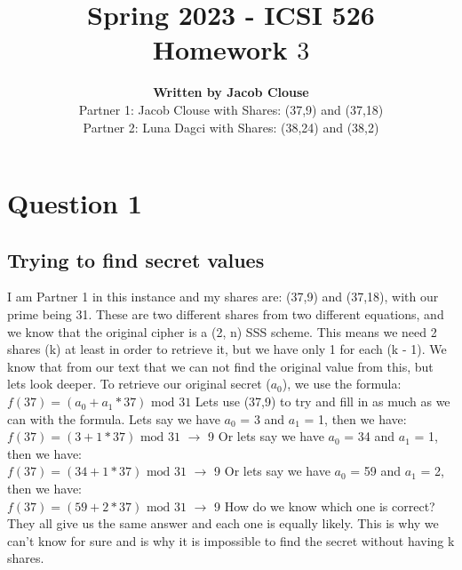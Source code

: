 \documentclass[10pt]{article}
\author{\vspace{0.2in}\textbf{Written by Jacob Clouse}\\  Partner 1: Jacob Clouse with Shares: (37,9) and (37,18)\\ Partner 2: Luna Dagci with Shares: (38,24) and (38,2)}
\title{Spring 2023 - ICSI 526\\Homework $3$}
\begin{document}
\maketitle
\tableofcontents
\vspace{0.2in}
\section{Question 1}
\subsection{Trying to find secret values}
\noindent I am Partner 1 in this instance and my shares are: (37,9) and  (37,18), with our prime being 31. These are two different shares from two different equations, and we know that the original cipher is a (2, n) SSS scheme. This means we need 2 shares (k) at least in order to retrieve it, but we have only 1 for each (k - 1). We know that from our text that we can not find the original value from this, but lets look deeper. To retrieve our original secret ($a_0$), we use the formula:\\ 

$f(37) = (a_0 + a_1*37) \textrm{ mod } 31$
\vspace{0.1in}
\newline
Lets use (37,9) to try and fill in as much as we can with the formula. Lets say we have $a_0$ = 3 and $a_1$ = 1, then we have:
\\ 

$f(37) = (3 + 1*37) \textrm{ mod } 31$
$\rightarrow$ 9
\vspace{0.1in}
\newline
Or lets say we have $a_0$ = 34 and $a_1$ = 1, then we have:
\\ 

$f(37) = (34 + 1*37) \textrm{ mod } 31$
$\rightarrow$ 9
\vspace{0.1in}
\newline
Or lets say we have $a_0$ = 59 and $a_1$ = 2, then we have:
\\ 

$f(37) = (59 + 2*37) \textrm{ mod } 31$
$\rightarrow$ 9
\vspace{0.1in}
\newline
How do we know which one is correct? They all give us the same answer and  each one is equally likely. This is why we can't know for sure and is why it is impossible to find the secret without having k shares.
\end{document}
